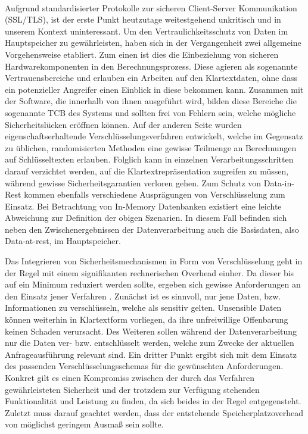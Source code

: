 \paragraph{}
Aufgrund standardisierter Protokolle zur sicheren Client-Server Kommunikation (\ac{SSL}/\ac{TLS}), ist der erste Punkt heutzutage weitestgehend unkritisch und in unserem Kontext uninteressant. Um den Vertraulichkeitsschutz von Daten im Hauptspeicher zu gewährleisten, haben sich in der Vergangenheit zwei allgemeine Vorgehensweise etabliert. Zum einen ist dies die Einbeziehung von sicheren Hardwarekomponenten in den Berechnungsprozess. Diese agieren als sogenannte Vertrauensbereiche und erlauben ein Arbeiten auf den Klartextdaten, ohne dass ein potenzieller Angreifer einen Einblick in diese bekommen kann. Zusammen mit der Software, die innerhalb von ihnen ausgeführt wird, bilden diese Bereiche die sogenannte \ac{TCB} des Systems und sollten frei von Fehlern sein, welche mögliche Sicherheitslücken eröffnen können. Auf der anderen Seite wurden eigenschaftserhaltende Verschlüsselungsverfahren entwickelt, welche im Gegensatz zu üblichen, randomisierten Methoden eine gewisse Teilmenge an Berechnungen auf Schlüsseltexten erlauben. Folglich kann in einzelnen Verarbeitungsschritten darauf verzichtet werden, auf die Klartextrepräsentation zugreifen zu müssen, während gewisse Sicherheitsgarantien verloren gehen. Zum Schutz von Data-in-Rest kommen ebenfalls verschiedene Ausprägungen von Verschlüsselung zum Einsatz. Bei Betrachtung von In-Memory Datenbanken existiert eine leichte Abweichung zur Definition der obigen Szenarien. In diesem Fall befinden sich neben den Zwischenergebnissen der Datenverarbeitung auch die Basisdaten, also Data-at-rest, im Hauptspeicher.

Das Integrieren von Sicherheitsmechanismen in Form von Verschlüsselung geht in der Regel mit einem signifikanten rechnerischen Overhead einher. Da dieser bis auf ein Minimum reduziert werden sollte, ergeben sich gewisse Anforderungen an den Einsatz jener Verfahren \cite{Shmueli2010}. Zunächst ist es sinnvoll, nur jene Daten, bzw. Informationen zu verschlüsseln, welche als sensitiv gelten. Unsensible Daten können weiterhin in Klartextform vorliegen, da ihre unfreiwillige Offenbarung keinen Schaden verursacht. Des Weiteren sollen während  der Datenverarbeitung nur die Daten ver- bzw. entschlüsselt werden, welche zum Zwecke der aktuellen Anfrageausführung relevant sind. Ein dritter Punkt ergibt sich mit dem Einsatz des passenden Verschlüsselungsschemas für die gewünschten Anforderungen. Konkret gilt es einen Kompromiss zwischen der durch das Verfahren gewährleisteten Sicherheit und der trotzdem zur Verfügung stehenden Funktionalität und Leistung zu finden, da sich beides in der Regel entgegensteht. Zuletzt muss darauf geachtet werden, dass der entstehende Speicherplatzoverhead von möglichst geringem Ausmaß sein sollte.

